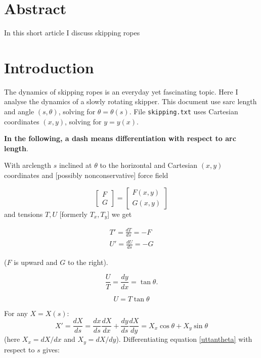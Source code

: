 \documentclass{article}
\begin{document}
\newcommand{\jj}{\sqrt{1+\left(y'\right)^2}}
\section*{Abstract}
In this short article I discuss skipping ropes



\section{Introduction}

The dynamics of skipping ropes is an everyday yet fascinating topic.
Here I analyse the dynamics of a slowly rotating skipper.  This
document use sarc length and angle $(s,\theta)$, solving for
$\theta=\theta(s)$.  File {\tt skipping.txt} uses Cartesian
coordinates $(x,y)$, solving for $y=y(x)$.

\citep{mohazzabi1999}

{\bf\large In the following, a dash means differentiation with respect
  to arc length}.


With arclength $s$ inclined at $\theta$ to the horizontal and
Cartesian $(x,y)$ coordinates and [possibly nonconservative] force
field

\begin{equation}
  \begin{bmatrix}F\\G\end{bmatrix}
    =
    \begin{bmatrix}F(x,y)\\G(x,y)\end{bmatrix}
\end{equation}
and tensions $T,U$ [formerly $T_x,T_y$] we get

\begin{eqnarray}
T'=  \frac{dT}{ds}=-F\label{Tx}\\
U'=  \frac{dU}{ds}=-G\label{Ty}
  \end{eqnarray}

($F$ is upward and $G$ to the right).

\begin{equation}
  \frac{U}{T}=\frac{dy}{dx}=\tan\theta.
\end{equation}


\begin{equation}
U=T\tan\theta\label{uttantheta}
\end{equation}

For any $X=X(s)$:
\begin{equation}
X'=\frac{dX}{ds}=\frac{dx}{ds}\frac{dX}{dx}+\frac{dy}{ds}\frac{dX}{dy}=X_x\cos\theta + X_y\sin\theta
\end{equation}
(here $X_x=dX/dx$ and $X_y=dX/dy$).  Differentiating equation
\ref{uttantheta} with respect to $s$ gives:
\end{document}
